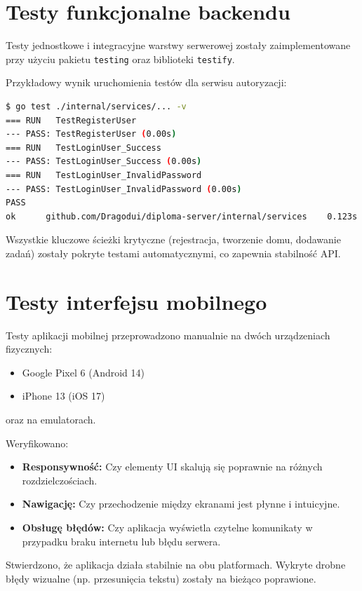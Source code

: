 \section{Testy funkcjonalne backendu}

Testy jednostkowe i integracyjne warstwy serwerowej zostały zaimplementowane przy użyciu pakietu \texttt{testing} oraz biblioteki \texttt{testify}.

Przykładowy wynik uruchomienia testów dla serwisu autoryzacji:
\begin{lstlisting}[language=bash, caption=Wynik testów jednostkowych, label=test:output]
$ go test ./internal/services/... -v
=== RUN   TestRegisterUser
--- PASS: TestRegisterUser (0.00s)
=== RUN   TestLoginUser_Success
--- PASS: TestLoginUser_Success (0.00s)
=== RUN   TestLoginUser_InvalidPassword
--- PASS: TestLoginUser_InvalidPassword (0.00s)
PASS
ok      github.com/Dragodui/diploma-server/internal/services    0.123s
\end{lstlisting}

Wszystkie kluczowe ścieżki krytyczne (rejestracja, tworzenie domu, dodawanie zadań) zostały pokryte testami automatycznymi, co zapewnia stabilność API.

\section{Testy interfejsu mobilnego}

Testy aplikacji mobilnej przeprowadzono manualnie na dwóch urządzeniach fizycznych:
\begin{itemize}
    \item Google Pixel 6 (Android 14)
    \item iPhone 13 (iOS 17)
\end{itemize}
oraz na emulatorach.

Weryfikowano:
\begin{itemize}
    \item \textbf{Responsywność:} Czy elementy UI skalują się poprawnie na różnych rozdzielczościach.
    \item \textbf{Nawigację:} Czy przechodzenie między ekranami jest płynne i intuicyjne.
    \item \textbf{Obsługę błędów:} Czy aplikacja wyświetla czytelne komunikaty w przypadku braku internetu lub błędu serwera.
\end{itemize}

Stwierdzono, że aplikacja działa stabilnie na obu platformach. Wykryte drobne błędy wizualne (np. przesunięcia tekstu) zostały na bieżąco poprawione.

